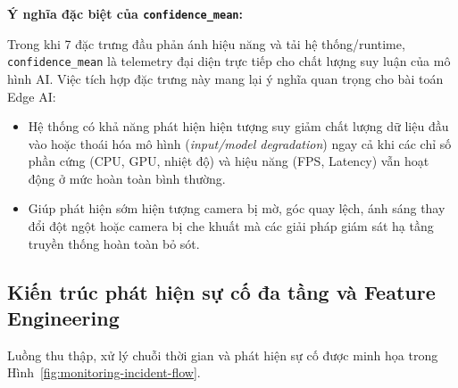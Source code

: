 \noindent\textbf{Ý nghĩa đặc biệt của \texttt{confidence\_mean}:} 

Trong khi 7 đặc trưng đầu phản ánh hiệu năng và tải hệ thống/runtime, \texttt{confidence\_mean} là telemetry đại diện trực tiếp cho chất lượng suy luận của mô hình AI. Việc tích hợp đặc trưng này mang lại ý nghĩa quan trọng cho bài toán Edge AI:
\begin{itemize}
  \item Hệ thống có khả năng phát hiện hiện tượng suy giảm chất lượng dữ liệu đầu vào hoặc thoái hóa mô hình (\textit{input/model degradation}) ngay cả khi các chỉ số phần cứng (CPU, GPU, nhiệt độ) và hiệu năng (FPS, Latency) vẫn hoạt động ở mức hoàn toàn bình thường.
  \item Giúp phát hiện sớm hiện tượng camera bị mờ, góc quay lệch, ánh sáng thay đổi đột ngột hoặc camera bị che khuất mà các giải pháp giám sát hạ tầng truyền thống hoàn toàn bỏ sót.
\end{itemize}

\subsection{Kiến trúc phát hiện sự cố đa tầng và Feature Engineering}

Luồng thu thập, xử lý chuỗi thời gian và phát hiện sự cố được minh họa trong Hình~\ref{fig:monitoring-incident-flow}.

